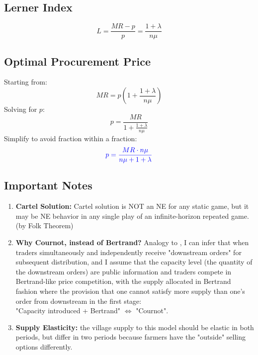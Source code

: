 \documentclass[12pt]{article}
\begin{document}
\subsection{Lerner Index}
\begin{equation}
L = \frac{MR - p}{p} = \frac{1 + \lambda}{n \mu}
\end{equation}

\subsection{Optimal Procurement Price}
Starting from:
\begin{equation}
MR = p \left(1 + \frac{1 + \lambda}{n \mu}\right)
\end{equation}
Solving for \( p \):
\begin{equation}
p = \frac{MR}{1 + \frac{1 + \lambda}{n \mu}}
\end{equation}
Simplify to avoid fraction within a fraction:
\begin{equation}
\textcolor{blue}{p = \frac{MR \cdot n \mu}{n \mu + 1 + \lambda}}
\label{Eq: optimal procure price, general case}
\end{equation}



\subsection{Important Notes}
\begin{enumerate}
    \item \textbf{Cartel Solution:} Cartel solution is NOT an NE for any static game, but it may be NE behavior in any single play of an infinite-horizon repeated game. (by Folk Theorem)
    
    \item \textbf{Why Cournot, instead of Bertrand?} Analogy to \cite{kreps1983quantity}, I can infer that when traders simultaneously and independently receive "downstream orders" for subsequent distribution, and I assume that the capacity level (the quantity of the downstream orders) are public information and traders compete in Bertrand-like price competition, with the supply allocated in Bertrand fashion where the provision that one cannot satisfy more supply than one's order from downstream in the first stage: \\
    "Capacity introduced + Bertrand" $\Longleftrightarrow$ "Cournot".

    \item \textbf{Supply Elasticity:} the village supply to this model should be elastic in both periods, but differ in two periods because farmers have the "outside" selling options differently. 
\end{enumerate}
\end{document}
